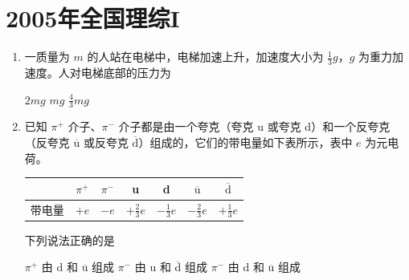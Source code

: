 \documentclass[\gkver]{gaokaozhenti}
\begin{document}
\chapter{2005年全国理综I}

\begin{enumerate}
\item
一质量为 $m$ 的人站在电梯中，电梯加速上升，加速度大小为 $\frac{1}{3}g$，$g$ 为重力加速度。人对电梯底部的压力为

{$2mg$}
{$mg$}
{$\frac{4}{3}mg$}


\item
已知 $\pi^{+}$ 介子、$\pi^{-}$ 介子都是由一个夸克（夸克 u 或夸克 d）和一个反夸克（反夸克 $\overline{\mathrm{u}}$ 或反夸克 $\overline{\mathrm{d}}$）组成的，它们的带电量如下表所示，表中 $e$ 为元电荷。

\begin{center}
\begin{tabular}{|c|c|c|c|c|c|c|}
\hline
 & $\pi^{+}$ & $\pi^{-}$ & u & d & $\overline{\mathrm{u}}$ & $\overline{\mathrm{d}}$ \\
\hline
带电量 & $+e$ & $-e$ & $+\frac{2}{3}e$ & $-\frac{1}{3}e$ & $-\frac{2}{3}e$ & $+\frac{1}{3}e$ \\
\hline
\end{tabular}
\end{center}

下列说法正确的是

{$\pi^{+}$ 由 d 和 $\overline{\mathrm{u}}$ 组成}
{$\pi^{-}$ 由 u 和 $\overline{\mathrm{d}}$ 组成}
{$\pi^{-}$ 由 d 和 $\overline{\mathrm{u}}$ 组成}



\end{enumerate}
\end{document}
